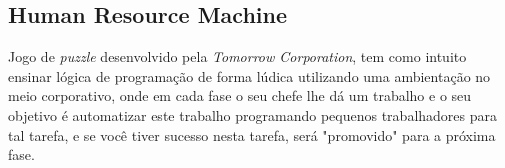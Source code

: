 \subsection{Human Resource Machine}

Jogo de \textit{puzzle} desenvolvido pela \textit{Tomorrow Corporation}, tem como intuito ensinar lógica de programação de forma lúdica utilizando uma ambientação no meio corporativo, onde em cada fase o seu chefe lhe dá um trabalho e o seu objetivo é automatizar este trabalho programando pequenos trabalhadores para tal tarefa, e se você tiver sucesso nesta tarefa, será "promovido" para a próxima fase. \cite{HumanResourceMachineSteam}


